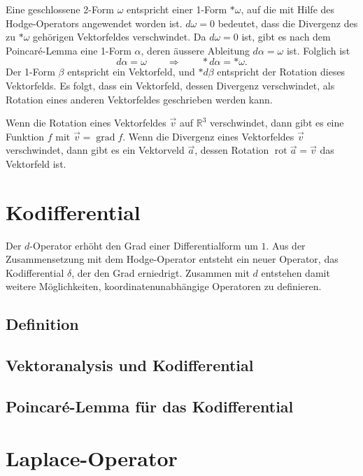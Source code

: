 Eine geschlossene 2-Form $\omega$ entspricht einer 1-Form $\ast\omega$,
auf die mit Hilfe des Hodge-Operators angewendet worden ist.
$d\omega=0$ bedeutet, dass die Divergenz des zu $\ast\omega$
gehörigen Vektorfeldes verschwindet.
Da $d\omega=0$ ist, gibt es nach dem Poincaré-Lemma eine 1-Form $\alpha$,
deren äussere Ableitung $d\alpha=\omega$ ist.
Folglich ist 
\[
d\alpha = \omega
\qquad\Rightarrow\qquad
\ast d\alpha = \ast\omega.
\]
Der 1-Form $\beta$ entspricht ein Vektorfeld, und $\ast d\beta$ entspricht
der Rotation dieses Vektorfelds.
Es folgt, dass ein Vektorfeld, dessen Divergenz verschwindet, als
Rotation eines anderen Vektorfeldes geschrieben werden kann.

\begin{satz}
Wenn die Rotation eines Vektorfeldes $\vec{v}$ auf $\mathbb{R}^3$
verschwindet, dann gibt es eine Funktion $f$ mit
$\vec{v}=\operatorname{grad}f$.
Wenn die Divergenz eines Vektorfeldes $\vec{v}$ verschwindet,
dann gibt es ein Vektorveld $\vec{a}$, dessen Rotation
$\operatorname{rot}\vec{a}=\vec{v}$ das Vektorfeld ist.
\end{satz}

%
%
\section{Kodifferential}
Der $d$-Operator erhöht den Grad einer Differentialform um $1$.
Aus der Zusammensetzung mit dem Hodge-Operator entsteht ein neuer
Operator, das Kodifferential $\delta$, der den Grad erniedrigt.
Zusammen mit $d$ entstehen damit weitere Möglichkeiten, koordinatenunabhängige
Operatoren zu definieren.

\subsection{Definition}

\subsection{Vektoranalysis und Kodifferential}

\subsection{Poincaré-Lemma für das Kodifferential}

%
%
\section{Laplace-Operator}



